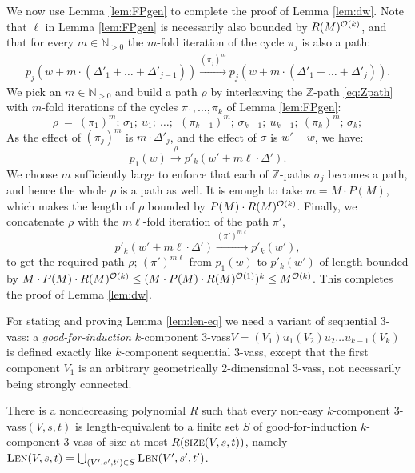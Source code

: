 \documentclass[a4paper, UKenglish, cleveref, autoref, thm-restate]{lipics-v2021}
\newcommand{\N}{\mathbb{N}}
\newcommand{\Z}{\mathbb{Z}}
\newcommand{\trans}[1]{\stackrel{#1}{\longrightarrow}}
\newcommand{\size}{\textsc{size}}
\newcommand{\Len}[3]{\textsc{Len}(#1, #2, #3)}
\newcommand{\OO}{{\cal O}}
\newcommand{\vass}{{\sc vass}\xspace}
\newcommand{\tvass}{\parvass 3}
\newcommand{\geomvass}{geometrically 2-dimensional \tvass}
\newcommand{\parvass}[1]{{$#1$-\vass}\xspace}
\newcommand{\ktvass}{(V_1) u_1 (V_2) u_2 \ldots u_{k-1} (V_k)}
\newcommand{\Npos}{\N_{>0}}
\begin{document}
\begin{appendixproof}
We now use Lemma \ref{lem:FPgen} to complete the proof of Lemma \ref{lem:dw}.
Note that $\ell$ in Lemma \ref{lem:FPgen} is necessarily also bounded by $R(M)^{\OO(k)}$, and that
for every $m\in\Npos$ the $m$-fold iteration of the cycle $\pi_j$ is also a path:
\begin{align}\label{eq:mfold}
p_j(w+m\cdot(\Delta'_1 + \ldots + \Delta'_{j-1})) \trans {(\pi_j)^m} p_j(w+ m\cdot(\Delta'_1 + \ldots + \Delta'_{j})).
\end{align}
We pick an $m\in \Npos$ and 
build a path $\rho$
by interleaving the $\Z$-path \eqref{eq:Zpath} with
$m$-fold iterations of the cycles $\pi_1, \ldots, \pi_k$ of Lemma \ref{lem:FPgen}:
\[
\rho \ = \ (\pi_1)^m;\, \sigma_1;\ u_1; \ \ldots; \ \ (\pi_{k-1})^m;\, \sigma_{k-1};\ u_{k-1}; \ (\pi_k)^m;\, \sigma_k;  \]
As the effect of $(\pi_j)^m$ is $m\cdot \Delta'_j$, and the effect of $\sigma$ is $w'-w$,
we have:
\[
p_1(w) \trans{\rho} p'_k(w'+m\ell\cdot \Delta').
\]
We choose $m$ sufficiently large to enforce that each of $\Z$-paths $\sigma_j$
becomes a path, and hence the whole $\rho$ is a path as well.
It is enough to take 
 $m = M\cdot P(M)$, which
makes the length of $\rho$ bounded by $P(M) \cdot R(M)^{\OO(k)}$.
Finally, we concatenate $\rho$ with the $m\ell$-fold iteration of the path $\pi'$,
\[
p'_k(w' + m\ell\cdot \Delta') \trans{(\pi')^{m\ell}} p'_k(w'),
\]
to get the required path $\rho;\, (\pi')^{m\ell}$
from $p_1(w)$ to $p'_k(w')$
of length bounded by $M\cdot P(M) \cdot R(M)^{\OO(k)} \leq
(M\cdot P(M)\cdot R(M)^{\OO(1)})^k \leq M^{\OO(k)}$.
This completes the proof of Lemma \ref{lem:dw}. \end{appendixproof}


For stating and proving Lemma \ref{lem:len-eq} we need a variant of sequential \tvass:
a \emph{good-for-induction} $k$-component \tvass $V=\ktvass$ is defined exactly like $k$-component
sequential \tvass, except that the first component $V_1$ is an arbitrary \geomvass,
not necessarily being strongly connected.
\begin{lemma} \label{lem:len-eq}
There is a nondecreasing polynomial $R$ such that 
every non-easy $k$-component \tvass $(V, s, t)$ is length-equivalent to a finite set $S$ of good-for-induction
$k$-component \tvass
of size at most $R(\size(V,s,t))$, namely
$\Len V s t = \bigcup_{(V', s', t')\in S} \Len {V'} {s'} {t'}$.
\end{lemma}
\end{document}
